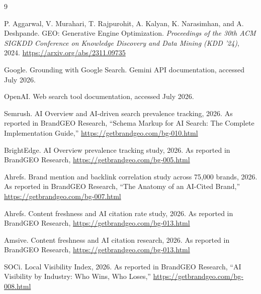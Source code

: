 \documentclass[11pt]{article}
\begin{document}

\begin{thebibliography}{9}

P. Aggarwal, V. Murahari, T. Rajpurohit, A. Kalyan, K. Narasimhan, and A. Deshpande.
GEO: Generative Engine Optimization. \textit{Proceedings of the 30th ACM SIGKDD
Conference on Knowledge Discovery and Data Mining (KDD '24)}, 2024.
\url{https://arxiv.org/abs/2311.09735}

Google. Grounding with Google Search. Gemini API documentation, accessed July 2026.

OpenAI. Web search tool documentation, accessed July 2026.

Semrush. AI Overview and AI-driven search prevalence tracking, 2026. As reported in
BrandGEO Research, ``Schema Markup for AI Search: The Complete Implementation Guide,''
\url{https://getbrandgeo.com/bg-010.html}

BrightEdge. AI Overview prevalence tracking study, 2026. As reported in BrandGEO
Research, \url{https://getbrandgeo.com/bg-005.html}

Ahrefs. Brand mention and backlink correlation study across 75{,}000 brands, 2026. As
reported in BrandGEO Research, ``The Anatomy of an AI-Cited Brand,''
\url{https://getbrandgeo.com/bg-007.html}

Ahrefs. Content freshness and AI citation rate study, 2026. As reported in BrandGEO
Research, \url{https://getbrandgeo.com/bg-013.html}

Amsive. Content freshness and AI citation research, 2026. As reported in BrandGEO
Research, \url{https://getbrandgeo.com/bg-013.html}

SOCi. Local Visibility Index, 2026. As reported in BrandGEO Research, ``AI Visibility
by Industry: Who Wins, Who Loses,'' \url{https://getbrandgeo.com/bg-008.html}

\end{thebibliography}
\end{document}
